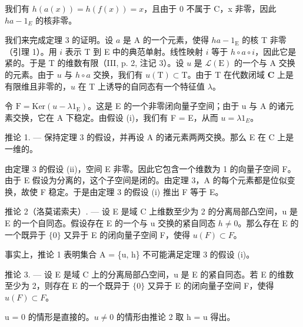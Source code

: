 我们有 \(h(a(x)) = h(f(x)) = x\)，且由于 0 不属于 C，x 非零，因此 \(ha - 1_{E}\) 的核非零。

我们来完成定理 3 的证明。设 \(a\) 是 A 的一个元素，使得 \(ha - 1_{\mathrm{E}}\) 的核 T 非零（引理 1）。用 \(i\) 表示 T 到 E 中的典范单射。线性映射 \(i\) 等于 \(h \circ a \circ i\)，因此它是紧的。于是 T 的维数有限（III, p. 2, 注记 3）。设 \(u\) 是 \(\mathcal{L}(\mathrm{E})\) 的一个与 A 交换的元素。由于 \(u\) 与 \(h \circ a\) 交换，我们有 \(u(\mathrm{T}) \subset \mathrm{T}\)。由于 T 在代数闭域 \(\mathbf{C}\) 上是有限维且非零的，\(u\) 在 T 上诱导的自同态有一个特征值 \(\lambda\)。

令 \(\mathrm{F} = \mathrm{Ker}(u - \lambda1_{\mathrm{E}})\)。这是 E 的一个非零闭向量子空间；由于 u 与 A 的诸元素交换，它在 A 下稳定。由假设 (i)，我们有 F = E，从而 \(u = \lambda1_{E}\)。

推论 1. --- 保持定理 3 的假设，并再设 A 的诸元素两两交换。那么 E 在 C 上是一维的。

由定理 3 的假设 (ii)，空间 E 非零。因此它包含一个维数为 1 的向量子空间 F。由于 E 假设为分离的，这个子空间是闭的。由定理 3，A 的每个元素都是位似变换，故使 F 稳定。于是由定理 3 的假设 (i) 推出 F 等于 E。

推论 2（洛莫诺索夫）. --- 设 E 是域 C 上维数至少为 2 的分离局部凸空间，u 是 E 的一个自同态。假设存在 E 的一个与 u 交换的紧自同态 \(h \neq 0\)。那么存在 E 的一个既异于 \(\{0\}\) 又异于 E 的闭向量子空间 F，使得 \(u(F) \subset F\)。

事实上，推论 1 表明集合 A = \{u, h\} 不可能满足定理 3 的假设 (i)。

推论 3. --- 设 E 是域 C 上的分离局部凸空间，u 是 E 的紧自同态。若 E 的维数至少为 2，则存在 E 的一个既异于 \(\{0\}\) 又异于 E 的闭向量子空间 F，使得 \(u(F) \subset F\)。

u = 0 的情形是直接的。\(u \neq 0\) 的情形由推论 2 取 h = u 得出。

